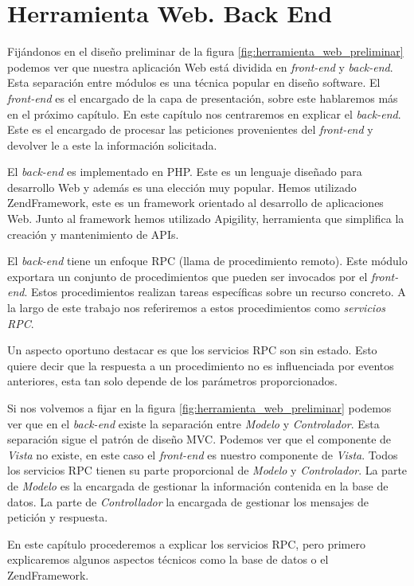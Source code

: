\chapter{Herramienta Web. Back End}
\label{backend}

Fijándonos en el diseño preliminar de la figura \ref{fig:herramienta_web_preliminar} podemos ver que nuestra aplicación Web está dividida en
\emph{front-end} y \emph{back-end}. Esta separación entre módulos es una técnica popular en diseño software. El \emph{front-end} es el encargado de
la capa de presentación, sobre este hablaremos más en el próximo capítulo. En este capítulo nos centraremos en explicar el \emph{back-end}. Este es el
encargado de procesar las peticiones provenientes del \emph{front-end} y devolver le a este la información solicitada. 
\par
El \emph{back-end} es implementado en PHP\cite{PHP}. Este es un lenguaje diseñado para desarrollo Web y además es una elección muy popular. 
Hemos utilizado ZendFramework\cite{ZF}, este es un framework orientado al desarrollo de aplicaciones Web. Junto al framework hemos utilizado
Apigility\cite{Apigility}, herramienta que simplifica la creación y mantenimiento de APIs.
\par
El \emph{back-end} tiene un enfoque RPC (llama de procedimiento remoto). Este módulo exportara un conjunto de procedimientos que pueden ser invocados
por el \emph{front-end}. Estos procedimientos realizan tareas específicas sobre un recurso concreto. A la largo de este trabajo nos referiremos
a estos procedimientos como \emph{servicios RPC}.
\par
Un aspecto oportuno destacar es que los servicios RPC son sin estado. Esto quiere decir que la respuesta a un procedimiento no es influenciada por
eventos anteriores, esta tan solo depende de los parámetros proporcionados.
\par
Si nos volvemos a fijar en la figura \ref{fig:herramienta_web_preliminar} podemos ver que en el \emph{back-end} existe la separación entre 
\emph{Modelo} y \emph{Controlador}. Esta separación sigue el patrón de diseño MVC\cite{MVCWiki}. Podemos ver que el componente de \emph{Vista} no
existe, en este caso el \emph{front-end} es nuestro componente de \emph{Vista}. Todos los servicios RPC tienen su parte proporcional de
\emph{Modelo} y \emph{Controlador}. La parte de \emph{Modelo} es la encargada de gestionar la información contenida en la base de datos. La parte de
\emph{Controllador} la encargada de gestionar los mensajes de petición y respuesta.
\par
En este capítulo procederemos a explicar los servicios RPC, pero primero explicaremos algunos aspectos técnicos como la base de datos o el ZendFramework.
